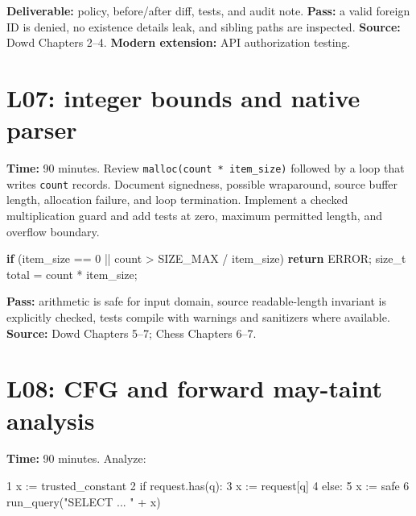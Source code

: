 \documentclass[
  letterpaper,
]{article}
\newenvironment{Shaded}{}{}
\newcommand{\ControlFlowTok}[1]{\textcolor[rgb]{0.00,0.44,0.13}{\textbf{#1}}}
\newcommand{\DataTypeTok}[1]{\textcolor[rgb]{0.56,0.13,0.00}{#1}}
\newcommand{\DecValTok}[1]{\textcolor[rgb]{0.25,0.63,0.44}{#1}}
\newcommand{\NormalTok}[1]{#1}
\newcommand{\OperatorTok}[1]{\textcolor[rgb]{0.40,0.40,0.40}{#1}}
\begin{document}
\textbf{Deliverable:} policy, before/after diff, tests, and audit note.
\textbf{Pass:} a valid foreign ID is denied, no existence details leak,
and sibling paths are inspected. \textbf{Source:} Dowd Chapters 2--4.
\textbf{Modern extension:} API authorization testing.

\section{L07: integer bounds and native
parser}\label{l07-integer-bounds-and-native-parser}

\textbf{Time:} 90 minutes. Review \texttt{malloc(count\ *\ item\_size)}
followed by a loop that writes \texttt{count} records. Document
signedness, possible wraparound, source buffer length, allocation
failure, and loop termination. Implement a checked multiplication guard
and add tests at zero, maximum permitted length, and overflow boundary.

\begin{Shaded}
\begin{Highlighting}[]
\ControlFlowTok{if} \OperatorTok{(}\NormalTok{item\_size }\OperatorTok{==} \DecValTok{0} \OperatorTok{||}\NormalTok{ count }\OperatorTok{\textgreater{}}\NormalTok{ SIZE\_MAX }\OperatorTok{/}\NormalTok{ item\_size}\OperatorTok{)}
    \ControlFlowTok{return}\NormalTok{ ERROR}\OperatorTok{;}
\DataTypeTok{size\_t}\NormalTok{ total }\OperatorTok{=}\NormalTok{ count }\OperatorTok{*}\NormalTok{ item\_size}\OperatorTok{;}
\end{Highlighting}
\end{Shaded}

\textbf{Pass:} arithmetic is safe for input domain, source
readable-length invariant is explicitly checked, tests compile with
warnings and sanitizers where available. \textbf{Source:} Dowd Chapters
5--7; Chess Chapters 6--7.

\section{L08: CFG and forward may-taint
analysis}\label{l08-cfg-and-forward-may-taint-analysis}

\textbf{Time:} 90 minutes. Analyze:

\begin{Shaded}
\begin{Highlighting}[]
\NormalTok{1 x := trusted\_constant}
\NormalTok{2 if request.has(\textquotesingle{}q\textquotesingle{}):}
\NormalTok{3     x := request[\textquotesingle{}q\textquotesingle{}]}
\NormalTok{4 else:}
\NormalTok{5     x := \textquotesingle{}safe\textquotesingle{}}
\NormalTok{6 run\_query("SELECT ... " + x)}
\end{Highlighting}
\end{Shaded}
\end{document}
